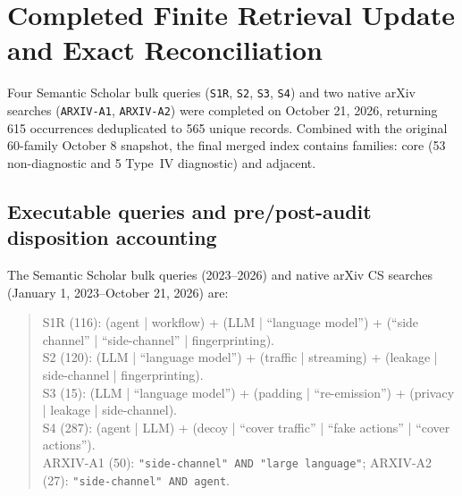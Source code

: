 \section{Completed Finite Retrieval Update and Exact Reconciliation}\label{app:search-update}
Four Semantic Scholar bulk queries (\texttt{S1R}, \texttt{S2}, \texttt{S3}, \texttt{S4}) and two native arXiv searches (\texttt{ARXIV-A1}, \texttt{ARXIV-A2}) were completed on October 21, 2026, returning 615 occurrences deduplicated to 565 unique records. Combined with the original 60-family October 8 snapshot, the final merged index contains \FinalN{} families: \FinalCore{} core (53 non-diagnostic and 5 Type~IV diagnostic) and \FinalAdjacent{} adjacent.

\subsection{Executable queries and pre/post-audit disposition accounting}
The Semantic Scholar bulk queries (2023--2026) and native arXiv CS searches (January 1, 2023--October 21, 2026) are:
\begin{quote}\small\raggedright
S1R (116): (agent | workflow) + (LLM | ``language model'') + (``side channel'' | ``side-channel'' | fingerprinting).\\
S2 (120): (LLM | ``language model'') + (traffic | streaming) + (leakage | side-channel | fingerprinting).\\
S3 (15): (LLM | ``language model'') + (padding | ``re-emission'') + (privacy | leakage | side-channel).\\
S4 (287): (agent | LLM) + (decoy | ``cover traffic'' | ``fake actions'' | ``cover actions'').\\
ARXIV-A1 (50): \texttt{"side-channel" AND "large language"}; ARXIV-A2 (27): \texttt{"side-channel" AND agent}.
\end{quote}

